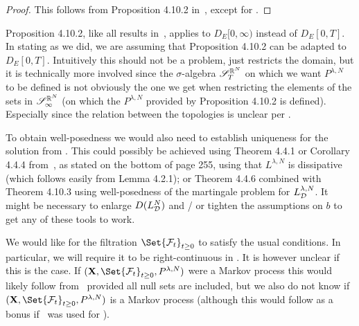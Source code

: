 \begin{proof}
  This follows from Proposition 4.10.2 in~\cite{ethierMarkovProcessesCharacterization1986}, except for \zcref{cav:MP-sol-on-[0,inf)}.
\end{proof}

\begin{caveat}\label{cav:MP-sol-on-[0,inf)}
  Proposition 4.10.2, like all results in~\cite{ethierMarkovProcessesCharacterization1986}, applies to \( D_E[0,\infty) \) instead of \( D_E[0,T] \).
  In stating  as we did, we are assuming that Proposition 4.10.2 can be adapted to \( D_E[0,T] \).
  Intuitively this should not be a problem, just restricts the domain, but it is technically more involved since the \( \sigma \)-algebra \( \mathscr{S}_T^{\mathbb{R}^N} \) on which we want \( P^{\lambda, N} \) to be defined is not obviously the one we get when restricting the elements of the sets in \( \mathscr{S}_\infty^{\mathbb{R}^N} \) (on which the \( P^{\lambda, N} \) provided by Proposition 4.10.2 is defined).
  Especially since the relation between the topologies is unclear per .
\end{caveat}

\begin{remark}\label{rem:uniqueness}
  To obtain well-posedness we would also need to establish uniqueness for the solution from .
  This could possibly be achieved using Theorem 4.4.1 or Corollary 4.4.4 from~\cite{ethierMarkovProcessesCharacterization1986}, as stated on the bottom of page 255, using that \( L^{\lambda, N} \) is dissipative (which follows easily from Lemma 4.2.1); or Theorem 4.4.6 combined with Theorem 4.10.3 using well-posedness of the martingale problem for \( L_{\mathcal{D}}^{\lambda, N} \).
  It might be necessary to enlarge \( D(L_{\mathcal{D}}^N) \) and / or tighten the assumptions on \( b \) to get any of these tools to work.
\end{remark}

\begin{caveat}\label{cav:right-cont-filtration}
  We would like for the filtration \( \Set{\cF_t}_{t\geq0} \) to satisfy the usual conditions.
  In particular, we will require it to be right-continuous in .
  It is however unclear if this is the case.
  If \( (\bm{X}, \Set{\cF_t}_{t\geq0}, P^{\lambda,N}) \) were a Markov process this would likely follow from~\cite[Theorem 2.3.4]{chungLecturesMarkovProcesses1982} provided all null sets are included, but we also do not know if \( (\bm{X}, \Set{\cF_t}_{t\geq0}, P^{\lambda,N}) \) is a Markov process (although this would follow as a bonus if~\cite[Theorem 4.4.1]{ethierMarkovProcessesCharacterization1986} was used for ).
\end{caveat}

